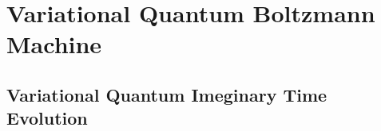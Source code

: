 \section{Variational Quantum Boltzmann Machine}
\subsection{Variational Quantum Imeginary Time Evolution}